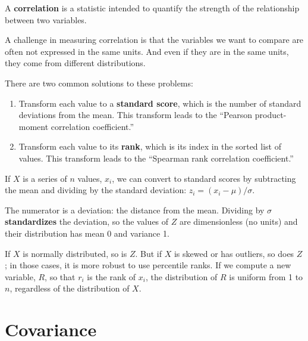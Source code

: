 \documentclass[12pt]{book}
\begin{document}
A {\bf correlation} is a statistic intended to quantify the strength
of the relationship between two variables.

A challenge in measuring correlation is that the variables we want to
compare are often not expressed in the same units.  And even if they
are in the same units, they come from different distributions.

There are two common solutions to these problems:

\begin{enumerate}

\item Transform each value to a {\bf standard score}, which is the
number of standard deviations from the mean.  
This transform leads to
the ``Pearson product-moment correlation coefficient.''

\item Transform each value to its {\bf rank}, which is its index in
the sorted list of values.  This transform
leads to the ``Spearman rank correlation coefficient.''

\end{enumerate}

If $X$ is a series of $n$ values, $x_i$, we can convert to standard
scores by subtracting the mean and dividing by the standard deviation:
$z_i = (x_i - \mu) / \sigma$.

The numerator is a deviation: the distance from the mean.  Dividing by
$\sigma$ {\bf standardizes} the deviation, so the values of $Z$ are
dimensionless (no units) and their distribution has mean 0 and
variance 1.

If $X$ is normally distributed, so is $Z$.  But if $X$ is skewed or has
outliers, so does $Z$; in those cases, it is more robust to use
percentile ranks.  If we compute a new variable, $R$, so that $r_i$ is
the rank of $x_i$, the distribution of $R$ is uniform
from 1 to $n$, regardless of the distribution of $X$.
 


\section{Covariance}
\end{document}
